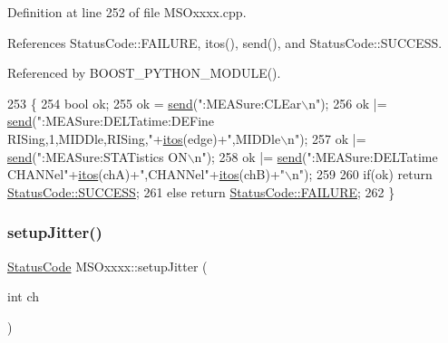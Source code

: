 Definition at line 252 of file M\+S\+Oxxxx.\+cpp.



References Status\+Code\+::\+F\+A\+I\+L\+U\+RE, itos(), send(), and Status\+Code\+::\+S\+U\+C\+C\+E\+SS.



Referenced by B\+O\+O\+S\+T\+\_\+\+P\+Y\+T\+H\+O\+N\+\_\+\+M\+O\+D\+U\+L\+E().


\begin{DoxyCode}
253 \{ 
254     \textcolor{keywordtype}{bool} ok;
255     ok  = \hyperlink{classMSOxxxx_ae77668a1ae4ccb74e0ed5f2485dfdebf}{send}(\textcolor{stringliteral}{":MEASure:CLEar\(\backslash\)n"});
256     ok |=   \hyperlink{classMSOxxxx_ae77668a1ae4ccb74e0ed5f2485dfdebf}{send}(\textcolor{stringliteral}{":MEASure:DELTatime:DEFine RISing,1,MIDDle,RISing,"}+\hyperlink{Tools_8h_af330027dbdafb9a30768b3613c553e60}{itos}(edge)+\textcolor{stringliteral}{",MIDDle\(\backslash\)n"});
257     ok |= \hyperlink{classMSOxxxx_ae77668a1ae4ccb74e0ed5f2485dfdebf}{send}(\textcolor{stringliteral}{":MEASure:STATistics ON\(\backslash\)n"});
258     ok |= \hyperlink{classMSOxxxx_ae77668a1ae4ccb74e0ed5f2485dfdebf}{send}(\textcolor{stringliteral}{":MEASure:DELTatime CHANNel"}+\hyperlink{Tools_8h_af330027dbdafb9a30768b3613c553e60}{itos}(chA)+\textcolor{stringliteral}{",CHANNel"}+\hyperlink{Tools_8h_af330027dbdafb9a30768b3613c553e60}{itos}(chB)+\textcolor{stringliteral}{"\(\backslash\)n"});
259 
260     \textcolor{keywordflow}{if}(ok)  \textcolor{keywordflow}{return} \hyperlink{classStatusCode_a6f565cbeadc76d14c72f047e5e85eb4badd0da38d3ba0d922efd1f4619bc37ad8}{StatusCode::SUCCESS};
261     \textcolor{keywordflow}{else}        \textcolor{keywordflow}{return} \hyperlink{classStatusCode_a6f565cbeadc76d14c72f047e5e85eb4ba3da73d4c469762eb9d3c960368252b26}{StatusCode::FAILURE};  
262 \}
\end{DoxyCode}
\mbox{\label{classMSOxxxx_a829d87b0aa03840ebfe0a44e560c7f63}} 
\subsubsection{\texorpdfstring{setup\+Jitter()}{setupJitter()}}
{\footnotesize\ttfamily \hyperlink{classStatusCode}{Status\+Code} M\+S\+Oxxxx\+::setup\+Jitter (\begin{DoxyParamCaption}\item[{int}]{ch }\end{DoxyParamCaption})}



